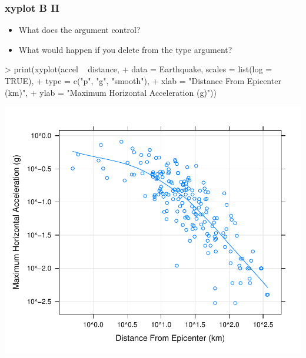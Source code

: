 \begin{frame}
  \frametitle{xyplot B II}
  \begin{itemize}
  \item What does the  argument control?
  \item What would happen if you delete  from the type argument?
  \end{itemize}
\begin{Schunk}
\begin{Sinput}
> print(xyplot(accel ~ distance, 
+     data = Earthquake, scales = list(log = TRUE), 
+     type = c("p", "g", "smooth"), 
+     xlab = "Distance From Epicenter (km)", 
+     ylab = "Maximum Horizontal Acceleration (g)"))
\end{Sinput}
\end{Schunk}
\includegraphics{plots/fig-023}
\end{frame}

